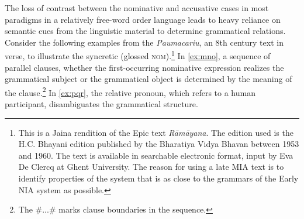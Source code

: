 \documentclass[output=paper,
modfonts
]{LSP/langsci}
\begin{document}
 
 The loss of contrast between the nominative and accusative cases in most paradigms in a relatively free-word order language leads to heavy reliance on semantic cues from the linguistic material to determine grammatical relations. Consider the following examples from the \textit{Paumacariu}, an 8th century text in verse, to illustrate the syncretic  (glossed \textsc{nom}).\footnote{This is a Jaina rendition
of the Epic  text  \textit{Rāmāyana}. The edition used is the H.C. Bhayani edition published by the Bharatiya Vidya Bhavan
between 1953 and 1960. The text is available in searchable electronic format, input by Eva De
Clercq at Ghent University. The reason for using a late MIA text is to identify properties of the system that is as  close to the grammars of the Early NIA system as possible.} In \cref{ex:mno}, a sequence of parallel clauses, whether the first-occurring nominative expression realizes the grammatical subject or the grammatical  object  is determined by the meaning of the clause.\footnote{The \#...\# marks clause boundaries in the sequence.} In \cref{ex:pqr}, the relative pronoun, which refers to a human participant, disambiguates the grammatical structure. 
\end{document}
